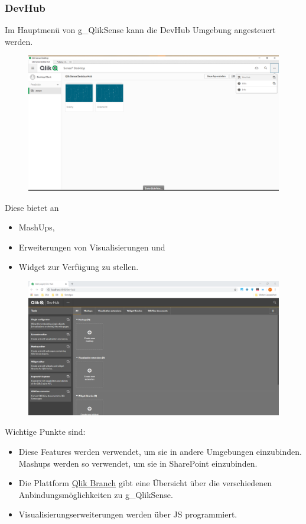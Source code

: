 \subsubsection{DevHub}
Im Hauptmenü von \gls{g_QlikSense} kann die DevHub Umgebung angesteuert werden.

\begin{figure}[H]
	\centering
	\includegraphics[scale = 0.3]{attachment/chapter_3/Scc009}
	\caption{}
	\label{fig:Scc009}
\end{figure}
Diese bietet an
\begin{itemize}
	\item MashUps, 
	\item Erweiterungen von Visualisierungen und
	\item Widget zur Verfügung zu stellen.
\end{itemize}

\begin{figure}[H]
	\centering
	\includegraphics[scale = 0.3]{attachment/chapter_3/Scc010}
	\caption{}
	\label{fig:Scc010}
\end{figure}
Wichtige Punkte sind:
\begin{itemize}
	\item Diese Features werden verwendet, um sie in andere Umgebungen einzubinden. Mashups werden so verwendet, um sie in SharePoint einzubinden.
	\item Die Plattform \href{www.branch.qlik.com}{Qlik Branch} gibt eine Übersicht über die verschiedenen Anbindungsmöglichkeiten zu \gls{g_QlikSense}.
	\item Visualisierungserweiterungen werden über \gls{JS} programmiert.
\end{itemize}
